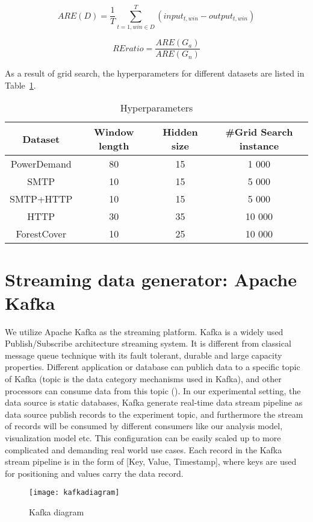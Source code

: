 \begin{equation}\label{eq:are}
ARE(D) = \frac{1}{T}\sum_{t=1,win\in D}^{T}(input_{t,win}-output_{t,win})
\end{equation}

\begin{equation}\label{eq:ratio}
REratio=\frac{ARE(G_a)}{ARE(G_n)}
\end{equation}


As a result of grid search, the hyperparameters for different datasets are listed in Table~\ref{tab:hyper}.

\begin{table}[h] 
\caption{Hyperparameters} 
\centering      
\begin{tabular}{c c c c}  
\hline\hline        
Dataset & Window length & Hidden size & \#Grid Search instance \\ [0.5ex] 
\hline 
PowerDemand & 80 & 15 & 1 000 \\  
SMTP & 10 & 15 &  5 000 \\ 
SMTP+HTTP & 10 & 15 & 5 000 \\ 
HTTP & 30 & 35  &  10 000 \\ 
ForestCover & 10 & 25 & 10 000 \\ [1ex]  
\hline    
\end{tabular}
\label{tab:hyper}  
\end{table} 


\section{Streaming data generator: Apache Kafka}
\label{sec:Streaming data generator: Apache Kafka}

We utilize Apache Kafka as the streaming platform. Kafka is a widely used Publish/Subscribe architecture streaming system. It is different from classical message queue technique with its fault tolerant, durable and large capacity properties. Different application or database can publich data to a specific topic of Kafka (topic is the data category mechanisms used in Kafka), and other processors can consume data from this topic (). In our experimental setting, the data source is static databases, Kafka generate real-time data stream pipeline as data source publish records to the experiment topic, and furthermore the stream of records will be consumed by different consumers like our analysis model, visualization model etc. This configuration can be easily scaled up to more complicated and demanding real world use cases. Each record in the Kafka stream pipeline is in the form of [Key, Value, Timestamp], where keys are used for positioning and values carry the data record.

\begin{figure}[h]
\centering
\texttt{[image: kafkadiagram]}
\caption[Kafka diagram]{Kafka diagram\footnotemark}
\label{fig:kafkadiagram}
\end{figure}









